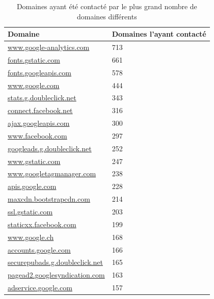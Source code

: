 		\begin{table}[]
\centering
\begin{tabular}{ll}
\textbf{Domaine}               & \textbf{Domaines l'ayant contacté} \\ \hline
\scriptsize \url{www.google-analytics.com}       & 713                               \\
\scriptsize \url{fonts.gstatic.com}              & 661                               \\
\scriptsize \url{fonts.googleapis.com}           & 578                               \\
\scriptsize \url{www.google.com}                 & 444                               \\
\scriptsize \url{stats.g.doubleclick.net}        & 343                               \\
\scriptsize \url{connect.facebook.net}           & 316                               \\
\scriptsize \url{ajax.googleapis.com}            & 300                               \\
\scriptsize \url{www.facebook.com}               & 297                               \\
\scriptsize \url{googleads.g.doubleclick.net}    & 252                               \\
\scriptsize \url{www.gstatic.com}                & 247                               \\
\scriptsize \url{www.googletagmanager.com}       & 238                               \\
\scriptsize \url{apis.google.com}                & 228                               \\
\scriptsize \url{maxcdn.bootstrapcdn.com}        & 214                               \\
\scriptsize \url{ssl.gstatic.com}                & 203                               \\
\scriptsize \url{staticxx.facebook.com}          & 199                               \\
\scriptsize \url{www.google.ch}                  & 168                               \\
\scriptsize \url{accounts.google.com}            & 166                               \\
\scriptsize \url{securepubads.g.doubleclick.net} & 165                               \\
\scriptsize \url{pagead2.googlesyndication.com}  & 163                               \\
\scriptsize \url{adservice.google.com}           & 157                              
\end{tabular}
\caption{Domaines ayant été contacté par le plus grand nombre de domaines différents}
\label{trackers-4}
\end{table}
